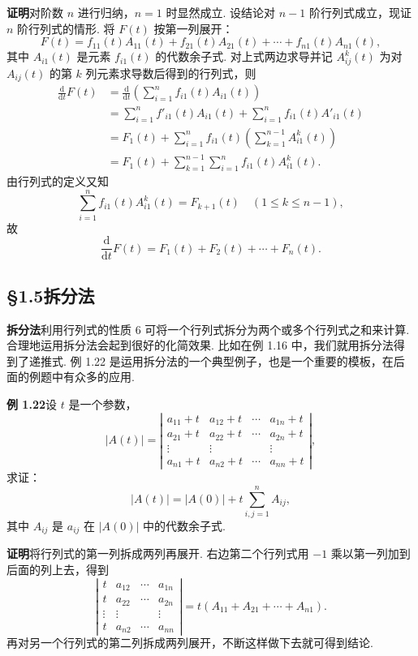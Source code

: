\documentclass[UTF8,12pt,a4paper,fontset=fandol]{ctexart}
\begin{document}
\noindent\textbf{证明}\quad 对阶数 $n$ 进行归纳，$n=1$ 时显然成立. 设结论对 $n-1$ 阶行列式成立，现证 $n$ 阶行列式的情形. 将 $F(t)$ 按第一列展开：
\[
F(t)=f_{11}(t)A_{11}(t)+f_{21}(t)A_{21}(t)+\cdots+f_{n1}(t)A_{n1}(t),
\]
其中 $A_{i1}(t)$ 是元素 $f_{i1}(t)$ 的代数余子式. 对上式两边求导并记 $A_{ij}^k(t)$ 为对 $A_{ij}(t)$ 的第 $k$ 列元素求导数后得到的行列式，则
\[
\begin{aligned}
\frac{\mathrm{d}}{\mathrm{d}t}F(t)
&=\frac{\mathrm{d}}{\mathrm{d}t}\left(\sum_{i=1}^n f_{i1}(t)A_{i1}(t)\right)\\
&=\sum_{i=1}^n f'_{i1}(t)A_{i1}(t)+\sum_{i=1}^n f_{i1}(t)A'_{i1}(t)\\
&=F_1(t)+\sum_{i=1}^n f_{i1}(t)\left(\sum_{k=1}^{n-1}A_{i1}^k(t)\right)\\
&=F_1(t)+\sum_{k=1}^{n-1}\sum_{i=1}^n f_{i1}(t)A_{i1}^k(t).
\end{aligned}
\]
由行列式的定义又知
\[
\sum_{i=1}^n f_{i1}(t)A_{i1}^k(t)=F_{k+1}(t)\quad(1\le k\le n-1),
\]
故
\[
\frac{\mathrm{d}}{\mathrm{d}t}F(t)=F_1(t)+F_2(t)+\cdots+F_n(t).
\]

\subsection*{§1.5\quad 拆分法}

\noindent\textbf{拆分法}\quad 利用行列式的性质 6 可将一个行列式拆分为两个或多个行列式之和来计算. 合理地运用拆分法会起到很好的化简效果. 比如在例 1.16 中，我们就用拆分法得到了递推式. 例 1.22 是运用拆分法的一个典型例子，也是一个重要的模板，在后面的例题中有众多的应用.

\noindent\textbf{例 1.22}\quad 设 $t$ 是一个参数，
\[
|A(t)|=\left|\begin{array}{cccc}
a_{11}+t & a_{12}+t & \cdots & a_{1n}+t\\
a_{21}+t & a_{22}+t & \cdots & a_{2n}+t\\
\vdots & \vdots &        & \vdots\\
a_{n1}+t & a_{n2}+t & \cdots & a_{nn}+t
\end{array}\right|,
\]
求证：
\[
|A(t)|=|A(0)|+t\sum_{i,j=1}^n A_{ij},
\]
其中 $A_{ij}$ 是 $a_{ij}$ 在 $|A(0)|$ 中的代数余子式.

\noindent\textbf{证明}\quad 将行列式的第一列拆成两列再展开. 右边第二个行列式用 $-1$ 乘以第一列加到后面的列上去，得到
\[
\left|\begin{array}{cccc}
t & a_{12} & \cdots & a_{1n}\\
t & a_{22} & \cdots & a_{2n}\\
\vdots & \vdots &        & \vdots\\
t & a_{n2} & \cdots & a_{nn}
\end{array}\right|
=t(A_{11}+A_{21}+\cdots+A_{n1}).
\]
再对另一个行列式的第二列拆成两列展开，不断这样做下去就可得到结论.
\end{document}
